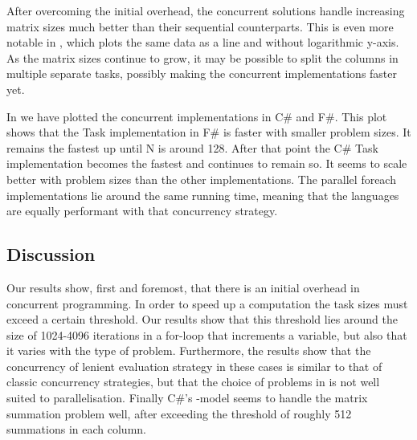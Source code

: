After overcoming the initial overhead, the concurrent solutions handle increasing matrix sizes much better than their sequential counterparts. This is even more notable in , which plots the same data as a line and without logarithmic y-axis. As the matrix sizes continue to grow, it may be possible to split the columns in multiple separate tasks, possibly making the concurrent implementations faster yet.


In  we have plotted the concurrent implementations in C\# and F\#. This plot shows that the Task implementation in F\# is faster with smaller problem sizes. It remains the fastest up until N is around 128. After that point the C\# Task implementation becomes the fastest and continues to remain so. It seems to scale better with problem sizes than the other implementations. The parallel foreach implementations lie around the same running time, meaning that the languages are equally performant with that concurrency strategy.

\subsection{Discussion}
Our results show, first and foremost, that there is an initial overhead in concurrent programming. In order to speed up a computation the task sizes must exceed a certain threshold. Our results show that this threshold lies around the size of 1024-4096 iterations in a for-loop that increments a variable, but also that it varies with the type of problem. Furthermore, the results show that the concurrency of lenient evaluation strategy in these cases is similar to that of classic concurrency strategies, but that the choice of problems in \cite{DBLP:journals/cl/Tremblay-parallel} is not well suited to parallelisation. Finally C\#'s -model seems to handle the matrix summation problem well, after exceeding the threshold of roughly 512 summations in each column.

